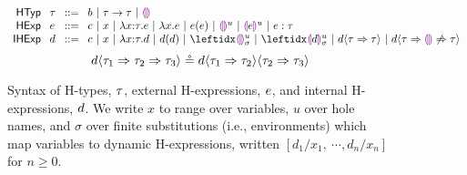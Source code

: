 \begin{figure}[t]
$\arraycolsep=4pt\begin{array}{rllllll}
\mathsf{HTyp} & \htau & ::= &
  b ~\vert~
  \tarr{\htau}{\htau} ~\vert~
  \tehole\\
\mathsf{HExp} & \hexp & ::= &
  c ~\vert~
  x ~\vert~
  \halam{x}{\htau}{\hexp} ~\vert~
      {\hlam{x}{\hexp}} ~\vert~
  \hap{\hexp}{\hexp} ~\vert~
  \hehole{u} ~\vert~
  \hhole{\hexp}{u} ~\vert~
  \hexp : \htau\\
 \mathsf{IHExp} & \dexp  & ::= &
  c ~\vert~
  x ~\vert~
  {\halam{x}{\htau}{\dexp}} ~\vert~
  \hap{\dexp}{\dexp} ~\vert~
  \dehole{\mvar}{\subst}{} ~\vert~
  \dhole{\dexp}{\mvar}{\subst}{} ~\vert~
  \dcasttwo{\dexp}{\htau}{\htau} ~\vert~
  \dcastfail{\dexp}{\htau}{\htau}\\
\end{array}$
$$
d \langle{\tau_1}\Rightarrow{\tau_2}\Rightarrow{\tau_3}\rangle \circeq
  d \langle{\tau_1}\Rightarrow{\tau_2}\rangle \langle{\tau_2}\Rightarrow{\tau_3}\rangle
$$
\vspace{-18px}
\caption{Syntax of H-types, $\tau$, external H-expressions, $e$, and internal H-expressions, $d$.
We write $x$ to range over variables,
$u$ over hole names, and
$\sigma$ over finite substitutions (i.e., environments) which map variables to dynamic H-expressions, written $[d_1/x_1, ~\cdots, d_n/x_n]$ for $n \geq 0$.}
\label{fig:HTyp}
\label{fig:HExp}
\label{fig:hazelnut-live-syntax}
\end{figure}
